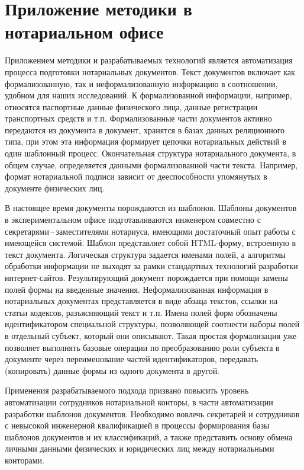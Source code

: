 \documentclass[utf8]{../IncArticle}
\begin{document}
\section{Приложение методики в нотариальном офисе}

Приложением методики и разрабатываемых технологий является
автоматизация процесса подготовки нотариальных документов.
Текст документов включает как формализованную, так и неформализованную
информацию в соотношении, удобном для наших исследований.  К
формализованной информации, например, относятся паспортные данные
физического лица, данные регистрации транспортных средств и т.п.
Формализованные части документов активно передаются из документа в
документ, хранятся в базах данных реляционного типа, при этом эта
информация формирует цепочки нотариальных действий в один шаблонный
процесс.  Окончательная структура нотариального документа, в общем случае,
определяется данными формализованной части текста.
Например, формат нотариальной подписи зависит от дееспособности
упомянутых в документе физических лиц.

В настоящее время документы порождаются из шаблонов.  Шаблоны
документов в экспериментальном офисе подготавливаются инженером
совместно с секретарями\,--\,заместителями нотариуса, имеющими
достаточный опыт работы с имеющейся системой.  Шаблон представляет
собой HTML-форму, встроенную в текст документа.  Логическая структура
задается именами полей, а алгоритмы обработки информации не выходят за
рамки стандартных технологий разработки интернет-сайтов.
Результирующий документ порождается при помощи замены полей формы на
введенные значения.  Неформализованная информация в нотариальных
документах представляется в виде абзаца текстов, ссылки на статьи
кодексов, разъясняющий текст и т.п.  Имена полей форм обозначены
идентификатором специальной структуры, позволяющей соотнести наборы
полей в отдельный субъект, который они описывают.  Такая простая
формализация уже позволяет выполнять базовые операции по
преобразованию роли субъекта в документе через переименование частей
идентификаторов, передавать (копировать) данные формы из одного
документа в другой.

Применения разрабатываемого подхода призвано повысить уровень
автоматизации сотрудников нотариальной конторы, в части автоматизации
разработки шаблонов документов. Необходимо вовлечь секретарей и
сотрудников с невысокой инженерной квалификацией в процессы
формирования базы шаблонов документов и их классификаций, а также
представить основу обмена личными данными физических и юридических лиц
между нотариальными конторами.
\end{document}
